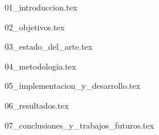 \documentclass[minitoc, hidelinks, headlogo, framedcover]{tfeEPCC}
\begin{document}


\pagestyle{fancy}
\setcounter{page}{1}

{01_introduccion.tex}

{02_objetivos.tex}

{03_estado_del_arte.tex}

{04_metodologia.tex}

{05_implementacion_y_desarrollo.tex}

{06_resultados.tex}

{07_conclusiones_y_trabajos_futuros.tex}




\pagebreak
\pagestyle{empty}
\makebibliography
\end{document}
